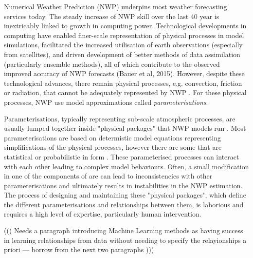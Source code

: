\documentclass[twocol]{ametsoc}
\begin{document}
Numerical Weather Prediction (NWP) underpins most weather forecasting services today. The steady increase of NWP skill over the last 40 year is inextricably linked to growth in computing power. Technological developments in computing have enabled finer-scale representation of physical processes in model simulations, facilitated the increased utilisation of earth observations (especially from satellites), and driven development of better methods of data assimilation (particularly ensemble methods), all of which contribute to the observed improved accuracy of NWP forecasts (Bauer et al, 2015). However, despite these technological advances, there remain physical processes, e.g. convection, friction or radiation, that cannot be adequately represented by NWP \citep{stensrud2009parameterization}. For these physical processes, NWP use model approximations called \emph{parameterisations}.

Parameterisations, typically representing sub-scale atmospheric processes, are usually lumped together inside "physical packages" that NWP models run \citep{LTG-81}. Most parameterisations are based on determistic model equations representing simplifications of the physical processes, however there are some that are statistical or probabilistic in form \citep{berner2017stochastic}. These parameterised processes can interact with each other leading to complex model behaviours.  Often, a small modification in one of the components of are can lead to inconsistencies with other parameterisations and ultimately results in instabilities in the NWP estimation. The process of designing and maintaining these "physical packages", which define the different parameterisations and relationships between them, is laborious and requires a high level of expertise, particularly human intervention.

((( Needs a paragraph introducing Machine Learning methods as having success in learning relationships from data without needing to specify the relayionships a priori  --- borrow from the next two paragraphs )))
\end{document}

